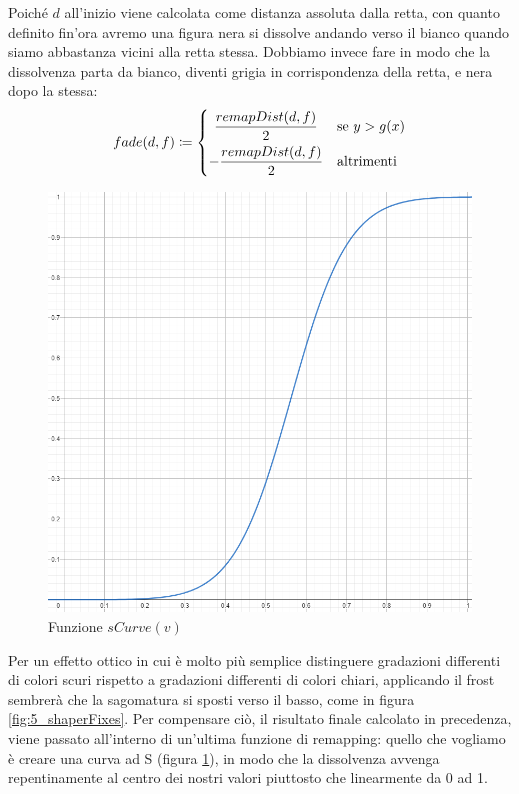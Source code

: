 \documentclass[main.tex]{subfiles}
\begin{document}
Poiché $d$ all'inizio viene calcolata come distanza assoluta dalla retta, con quanto definito fin'ora avremo una figura nera si dissolve andando verso il bianco quando siamo abbastanza vicini alla retta stessa. Dobbiamo invece fare in modo che la dissolvenza parta da bianco, diventi grigia in corrispondenza della retta, e nera dopo la stessa:
\[fade(d, f) \coloneqq 
	\begin{dcases}
		\hfil	 \frac{remapDist(d, f)}{2} & \text{se } y > g(x)\\
				-\frac{remapDist(d, f)}{2} & \text{altrimenti}
	\end{dcases}
\]
\newline

\begin{figure}
    \centering
    \captionsetup{justification=centering}
    \includegraphics[scale=0.35]{img/newFeatures/sCurve.png}
    \caption{Funzione $sCurve(v)$}
    \label{fig:5_sCurve}
\end{figure}
Per un effetto ottico in cui è molto più semplice distinguere gradazioni differenti di colori scuri rispetto a gradazioni differenti di colori chiari, applicando il frost sembrerà che la sagomatura si sposti verso il basso, come in figura \ref{fig:5_shaperFixes}. Per compensare ciò, il risultato finale calcolato in precedenza, viene passato all'interno di un'ultima funzione di remapping: quello che vogliamo è creare una curva ad S (figura \ref{fig:5_sCurve}), in modo che la dissolvenza avvenga repentinamente al centro dei nostri valori piuttosto che linearmente da 0 ad 1.
\end{document}
